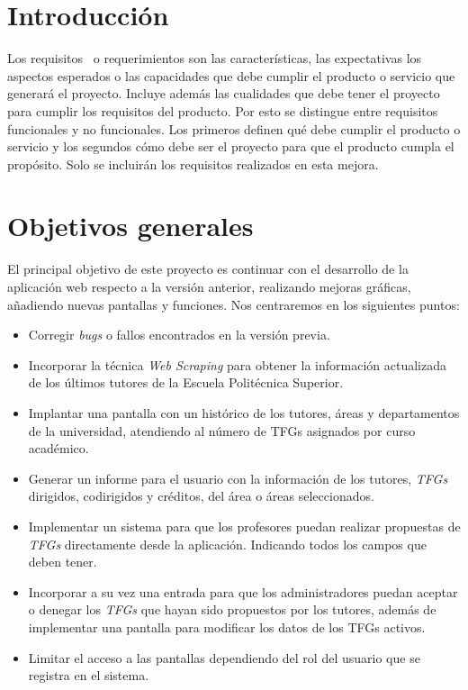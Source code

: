 
\section{Introducción}

Los requisitos~\cite{Requisito} o requerimientos son las características, las expectativas los aspectos esperados o las capacidades que debe cumplir el producto o servicio que generará el proyecto. Incluye además las cualidades que debe tener el proyecto para cumplir los requisitos del producto. Por esto se distingue entre requisitos funcionales y no funcionales. Los primeros definen qué debe cumplir el producto o servicio y los segundos cómo debe ser el proyecto para que el producto cumpla el propósito.
Solo se incluirán los requisitos realizados en esta mejora.

\section{Objetivos generales}
El principal objetivo de este proyecto es continuar con el desarrollo de la aplicación web respecto a la versión anterior, realizando mejoras gráficas, añadiendo nuevas pantallas y funciones.
Nos centraremos en los siguientes puntos:
\begin{itemize}
	\item Corregir \emph{bugs} o fallos encontrados en la versión previa.
	\item Incorporar la técnica \emph{Web Scraping} para obtener la información actualizada de los últimos tutores de la Escuela Politécnica Superior.
	\item Implantar una pantalla con un histórico de los tutores, áreas y departamentos de la universidad, atendiendo al número de TFGs asignados por curso académico. 
	\item Generar un informe para el usuario con la información de los tutores, \emph{TFGs} dirigidos, codirigidos y créditos, del área o áreas seleccionados.
	\item Implementar un sistema para que los profesores puedan realizar propuestas de \emph{TFGs} directamente desde la aplicación. Indicando todos los campos que deben tener. 
	\item Incorporar a su vez una entrada para que los administradores puedan aceptar o denegar los \emph{TFGs} que hayan sido propuestos por los tutores, además de implementar una pantalla para modificar los datos de los TFGs activos.
	\item Limitar el acceso a las pantallas dependiendo del rol del usuario que se registra en el sistema.
\end{itemize}

